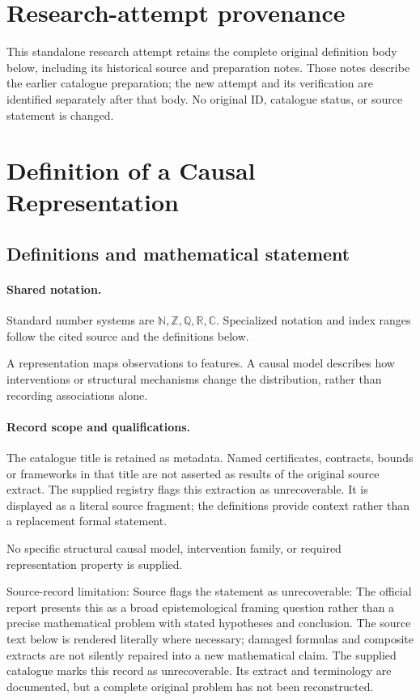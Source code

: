 \documentclass[11pt]{article}
\begin{document}
\section*{Research-attempt provenance}
This standalone research attempt retains the complete original definition body below,
including its historical source and preparation notes. Those notes describe the
earlier catalogue preparation; the new attempt and its verification are identified
separately after that body. No original ID, catalogue status, or source statement is changed.

\section{Definition of a Causal Representation}\label{statement}

\subsection{Definitions and mathematical statement}

\paragraph{Shared notation.}Standard number systems are $\mathbb N,\mathbb Z,\mathbb Q,\mathbb R,\mathbb C$. Specialized notation and index ranges follow the cited source and the definitions below.


A representation maps observations to features. A causal model describes how interventions or structural mechanisms change the distribution, rather than recording associations alone.
\paragraph{Record scope and qualifications.}
The catalogue title is retained as metadata. Named certificates, contracts, bounds or frameworks in that title are not asserted as results of the original source extract.
The supplied registry flags this extraction as unrecoverable. It is displayed as a literal source fragment; the definitions provide context rather than a replacement formal statement.

No specific structural causal model, intervention family, or required representation property is supplied.

Source-record limitation: Source flags the statement as unrecoverable: The official report presents this as a broad epistemological framing question rather than a precise mathematical problem with stated hypotheses and conclusion.
The source text below is rendered literally where necessary; damaged formulas and composite extracts are not silently repaired into a new mathematical claim.
The supplied catalogue marks this record as unrecoverable. Its extract and terminology are documented, but a complete original problem has not been reconstructed.
\end{document}
